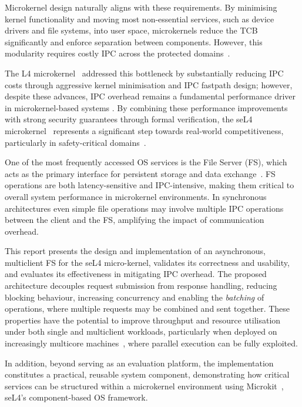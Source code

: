\newpage
Microkernel design naturally aligns with these requirements. By minimising kernel functionality and moving most non-essential services, such as device drivers and file systems, into user space, microkernels reduce the TCB significantly and enforce separation between components. However, this modularity requires costly IPC across the protected domains~\cite{silberschatz2013operating}. 

The L4 microkernel~\cite{liedtke_improving_1993} addressed this bottleneck by substantially reducing IPC costs through aggressive kernel minimisation and IPC fastpath design; however, despite these advances, IPC overhead remains a fundamental performance driver in microkernel-based systems \cite{liedtke_improving_1993}. By combining these performance improvements with strong security guarantees through formal verification, the seL4 microkernel~\cite{klein_sel4_2009} represents a significant step towards real-world competitiveness, particularly in safety-critical domains~\cite{heiser_l4_2016}.

One of the most frequently accessed OS services is the File Server (FS), which acts as the primary interface for persistent storage and data exchange~\cite{silberschatz2013operating}. FS operations are both latency-sensitive and IPC-intensive, making them critical to overall system performance in microkernel environments. In synchronous architectures even simple file operations may involve multiple IPC operations between the client and the FS, amplifying the impact of communication overhead.

This report presents the design and implementation of an asynchronous, multiclient FS for the seL4 micro-kernel, validates its correctness and usability, and evaluates its effectiveness in mitigating IPC overhead. The proposed architecture decouples request submission from response handling, reducing blocking behaviour, increasing concurrency and enabling the \textit{batching} of operations, where multiple requests may be combined and sent together. These properties have the potential to improve throughput and resource utilisation under both single and multiclient workloads, particularly when deployed on increasingly multicore machines~\cite{tang_transparent_2022}, where parallel execution can be fully exploited. 

In addition, beyond serving as an evaluation platform, the implementation constitutes a practical, reusable system component, demonstrating how critical services can be structured within a microkernel environment using Microkit~\cite{kocsis_sel4_2023}, seL4's component-based OS framework. 

